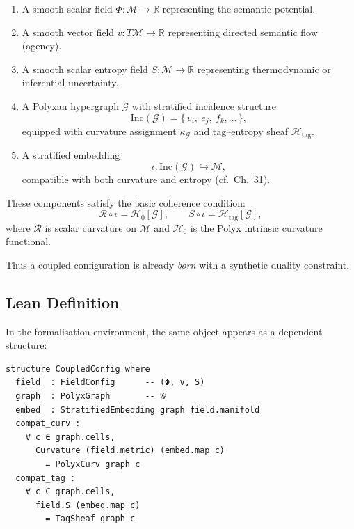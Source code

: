 \begin{enumerate}
\item A smooth scalar field $\Phi : \mathcal{M} \to \mathbb{R}$ representing the semantic potential.

\item A smooth vector field $v : T\mathcal{M} \to \mathbb{R}$ representing directed semantic flow (agency).

\item A smooth scalar entropy field $S : \mathcal{M} \to \mathbb{R}$ representing thermodynamic or inferential uncertainty.

\item A Polyxan hypergraph $\mathcal{G}$ with stratified incidence structure
\[
   \mathrm{Inc}(\mathcal{G})
     = \{\, v_i,\ e_j,\ f_k,\ldots \,\},
\]
equipped with curvature assignment $\kappa_{\mathcal{G}}$ and tag–entropy sheaf $\mathcal{H}_{\mathrm{tag}}$.

\item A stratified embedding
\[
   \iota : \mathrm{Inc}(\mathcal{G}) \hookrightarrow \mathcal{M},
\]
compatible with both curvature and entropy (cf.~Ch.~31).
\end{enumerate}

These components satisfy the basic coherence condition:
\begin{equation}
\label{eq:coupled-config-compatibility}
   \mathcal{R}\circ\iota = \mathcal{H}_0[\mathcal{G}],
   \qquad
   S\circ\iota = \mathcal{H}_{\mathrm{tag}}[\mathcal{G}],
\end{equation}
where $\mathcal{R}$ is scalar curvature on $\mathcal{M}$ and $\mathcal{H}_0$ is the Polyx intrinsic curvature functional.

Thus a coupled configuration is already \emph{born} with a synthetic duality constraint.

\subsection{Lean Definition}

In the formalisation environment, the same object appears as a dependent structure:

\begin{verbatim}
structure CoupledConfig where
  field  : FieldConfig      -- (Φ, v, S)
  graph  : PolyxGraph       -- 𝒢
  embed  : StratifiedEmbedding graph field.manifold
  compat_curv :
    ∀ c ∈ graph.cells,
      Curvature (field.metric) (embed.map c)
        = PolyxCurv graph c
  compat_tag :
    ∀ c ∈ graph.cells,
      field.S (embed.map c)
        = TagSheaf graph c
\end{verbatim}

